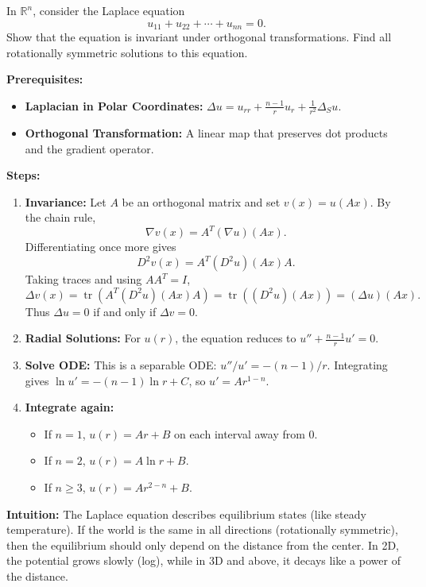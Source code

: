 \begin{exercise}
\label{analysis:2017:11}
In $\mathbb{R}^n$, consider the Laplace equation
\[
u_{11}+u_{22}+\cdots+u_{nn}=0.
\]
Show that the equation is invariant under orthogonal transformations. Find all rotationally symmetric solutions to this equation.
\end{exercise}

\begin{solution}
\textbf{Prerequisites:}
\begin{itemize}
    \item \textbf{Laplacian in Polar Coordinates:} $\Delta u = u_{rr} + \frac{n-1}{r} u_r + \frac{1}{r^2} \Delta_{S} u$.
    \item \textbf{Orthogonal Transformation:} A linear map that preserves dot products and the gradient operator.
\end{itemize}

\textbf{Steps:}
\begin{enumerate}
    \item \textbf{Invariance:} Let $A$ be an orthogonal matrix and set $v(x)=u(Ax)$. By the chain rule,
    \[
    \nabla v(x)=A^T(\nabla u)(Ax).
    \]
    Differentiating once more gives
    \[
    D^2v(x)=A^T(D^2u)(Ax)A.
    \]
    Taking traces and using $AA^T=I$,
    \[
    \Delta v(x)=\operatorname{tr}(A^T(D^2u)(Ax)A)
    =\operatorname{tr}((D^2u)(Ax))=(\Delta u)(Ax).
    \]
    Thus $\Delta u=0$ if and only if $\Delta v=0$.
    \item \textbf{Radial Solutions:} For $u(r)$, the equation reduces to $u'' + \frac{n-1}{r} u' = 0$.
    \item \textbf{Solve ODE:} This is a separable ODE: $u''/u' = -(n-1)/r$. Integrating gives $\ln u' = -(n-1)\ln r + C$, so $u' = A r^{1-n}$.
    \item \textbf{Integrate again:}
    \begin{itemize}
        \item If $n=1$, $u(r)=Ar+B$ on each interval away from $0$.
        \item If $n=2$, $u(r) = A \ln r + B$.
        \item If $n \geq 3$, $u(r) = A r^{2-n} + B$.
    \end{itemize}
\end{enumerate}

\textbf{Intuition:}
The Laplace equation describes equilibrium states (like steady temperature). If the world is the same in all directions (rotationally symmetric), then the equilibrium should only depend on the distance from the center. In 2D, the potential grows slowly (log), while in 3D and above, it decays like a power of the distance.
\end{solution}

